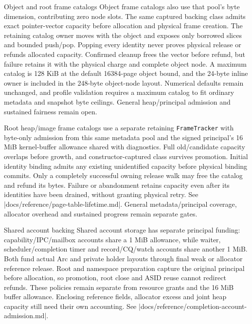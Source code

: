\begin{implementationdetail}{Object and root frame catalogs}
Object frame catalogs also use that pool's byte dimension, contributing zero node
slots. The same captured backing class admits exact pointer-vector capacity
before allocation and physical frame creation. The retaining catalog owner
moves with the object and exposes only borrowed slices and bounded push/pop.
Popping every identity never proves physical release or refunds allocated
capacity. Confirmed cleanup frees the vector before refund, but failure retains it
with the physical charge and complete object node. A maximum catalog is 128 KiB
at the default 16384-page object bound, and the 24-byte inline owner is included in
the 248-byte object-node layout. Numerical defaults remain unchanged, and profile
validation requires a maximum catalog to fit ordinary metadata and snapshot byte
ceilings. General heap/principal admission and sustained fairness remain open.

Root heap/image frame catalogs use a separate retaining \texttt{FrameTracker}
with byte-only admission from this same metadata pool and the signed principal's
16 MiB kernel-buffer allowance shared with diagnostics. Full old/candidate
capacity overlaps before growth, and constructor-captured class survives promotion.
Initial identity binding admits any existing unidentified capacity before
physical binding commits. Only a completely successful owning release walk may
free the catalog and refund its bytes. Failure or abandonment retains capacity
even after its identities have been drained, without granting physical retry.
See \repofile|docs/reference/page-table-lifetime.md|. General metadata/principal
coverage, allocator overhead and sustained progress remain separate gates.
\end{implementationdetail}

\begin{implementationdetail}{Shared account backing}
Shared account storage has separate principal funding: capability/IPC/mailbox
accounts share a 1 MiB allowance, while waiter, scheduler/completion timer and
record/CQ/watch accounts share another 1 MiB. Both fund actual Arc and private
holder layouts through final weak or allocator reference release. Root and
namespace preparation capture the original principal before allocation, so promotion,
root close and ASID reuse cannot redirect refunds. These policies remain separate
from resource grants and the 16 MiB buffer allowance. Enclosing reference fields,
allocator excess and joint heap capacity still need their own accounting.
See \repofile|docs/reference/completion-account-admission.md|.
\end{implementationdetail}

